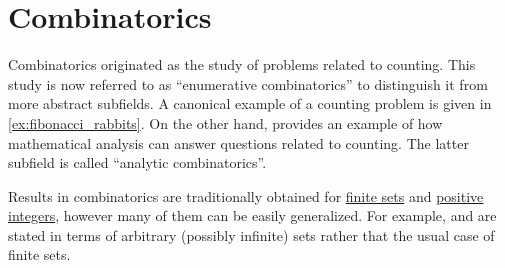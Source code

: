 \chapter{Combinatorics}\label{ch:combinatorics}

Combinatorics originated as the study of problems related to counting. This study is now referred to as \enquote{enumerative combinatorics} to distinguish it from more abstract subfields. A canonical example of a counting problem is given in \cref{ex:fibonacci_rabbits}. On the other hand,  provides an example of how mathematical analysis can answer questions related to counting. The latter subfield is called \enquote{analytic combinatorics}.

Results in combinatorics are traditionally obtained for \hyperref[def:set_finiteness]{finite sets} and \hyperref[def:integer_signum]{positive integers}, however many of them can be easily generalized. For example,  and  are stated in terms of arbitrary (possibly infinite) sets rather that the usual case of finite sets.

